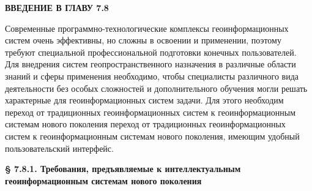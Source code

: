 
\begin{SCn}
\begin{small}

\textbf{ВВЕДЕНИЕ В ГЛАВУ 7.8}

Современные программно-технологические комплексы геоинформационных систем очень эффективны, но сложны в освоении и применении, поэтому требуют специальной профессиональной подготовки конечных пользователей. Для внедрения систем геопространственного назначения в различные области знаний и сферы применения необходимо, чтобы специалисты различного вида деятельности без особых сложностей и дополнительного обучения могли решать характерные для геоинформационных систем задачи.
Для этого необходим переход от традиционных геоинформационных систем к геоинформационным системам нового поколения переход от традиционных геоинформационных систем к геоинформационным системам нового поколения, имеющим удобный пользовательский интерфейс.

\bigskip

\textbf{§ 7.8.1. Требования, предъявляемые к интеллектуальным геоинформационным
                 системам нового поколения}



    \begin{scnindent}
    \begin{scneqtoset}
    \end{scneqtoset}
    \end{scnindent}
  
    \begin{scnindent}
    \begin{scneqtoset}
    \end{scneqtoset}
    \end{scnindent}


\end{small}
\end{SCn}
